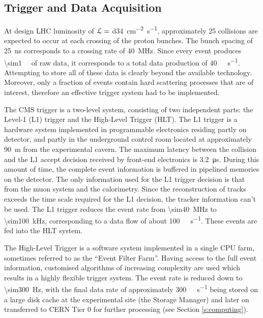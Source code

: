 \subsection{Trigger and Data Acquisition}
\label{ss:trigger_daq}
At design LHC luminosity of $\mathcal{L} = $ \SI{d34}{\cm^{-2} s^{-1}}, approximately \num{25} collisions are expected to
occur at each crossing of the proton bunches. The bunch spacing of \SI{25}{\ns} corresponds to a crossing rate of
\SI{40}{\mega\hertz}. Since every event produces \SI{\sim1}{\mega\byte} of raw data, it corresponds to a total data
production of \SI{40}{\tera\byte\per\second}. Attempting to store all of these data is clearly beyond the available
technology. Moreover, only a fraction of events contain hard scattering processes that are of interest, therefore an
effective trigger system had to be implemented.

The CMS trigger is a two-level system, consisting of two independent parts: the Level-1 (L1) trigger and the High-Level
Trigger (HLT). The L1 trigger is a hardware system implemented in programmable electronics residing partly on detector,
and partly in the underground control room located at approximately \SI{90}{\metre} from the experimental cavern. The
maximum latency between the collision and the L1 accept decision received by front-end electronics is
\SI{3.2}{\micro\second}. During this amount of time, the complete event information is buffered in pipelined memories
on the detector. The only information used for the L1 trigger decision is that from the muon system and the calorimetry.
Since the reconstruction of tracks exceeds the time scale required for the L1 decision, the tracker information can't be
used. The L1 trigger reduces the event rate from \SI{\sim40}{\mega\hertz} to \SI{\sim100}{\kilo\hertz}, corresponding to
a data flow of about \SI{100}{\giga\byte\per\second}. These events are fed into the HLT system.

The High-Level Trigger is a software system implemented in a single CPU farm, sometimes referred to as the ``Event
Filter Farm''. Having access to the full event information, customised algorithms of increasing complexity are used
which results in a highly flexible trigger system. The event rate is reduced down to \SI{\sim300}{\Hz}, with the final
data rate of approximately \SI{300}{\mega\byte\per\second} being stored on a large disk cache at the experimental site
(the Storage Manager) and later on transferred to CERN Tier 0 for further processing (see Section \ref{s:computing}).

